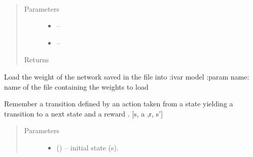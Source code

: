 \documentclass[letterpaper,10pt,english]{sphinxmanual}
\begin{document}
\begin{fulllineitems}
\begin{fulllineitems}
\label{\detokenize{package2:policyLearning.PolicyLearner.get_stall}}
\end{fulllineitems}


\begin{fulllineitems}
\label{\detokenize{package2:policyLearning.PolicyLearner.init_stall}}~\begin{quote}\begin{description}
\item[{Parameters}] \leavevmode\begin{itemize}
\item {} 
 -- 

\item {} 
 -- 

\end{itemize}

\item[{Returns}] \leavevmode


\end{description}\end{quote}

\end{fulllineitems}


\begin{fulllineitems}
\label{\detokenize{package2:policyLearning.PolicyLearner.load}}
Load the weight of the network saved in the file into :ivar model
:param name: name of the file containing the weights to load

\end{fulllineitems}


\begin{fulllineitems}
\label{\detokenize{package2:policyLearning.PolicyLearner.remember}}
Remember a transition defined by an action  taken from a state  yielding a transition to a next
state  and a reward . {[}s, a ,r, s'{]}
\begin{quote}\begin{description}
\item[{Parameters}] \leavevmode\begin{itemize}
\item {} 
 () -- initial state (s).


\end{itemize}
\end{description}
\end{quote}
\end{fulllineitems}
\end{fulllineitems}
\end{document}
